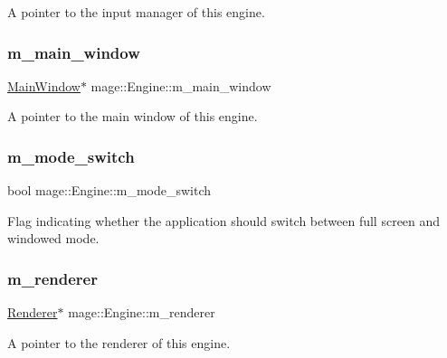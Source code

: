 A pointer to the input manager of this engine. \hypertarget{classmage_1_1_engine_abe33f2ef533f142a0e9ba8d3a2a51d6b}{}\label{classmage_1_1_engine_abe33f2ef533f142a0e9ba8d3a2a51d6b} 
\subsubsection{\texorpdfstring{m\+\_\+main\+\_\+window}{m\_main\_window}}
{\footnotesize\ttfamily \hyperlink{classmage_1_1_main_window}{Main\+Window}$\ast$ mage\+::\+Engine\+::m\+\_\+main\+\_\+window\hspace{0.3cm}{\ttfamily [private]}}

A pointer to the main window of this engine. \hypertarget{classmage_1_1_engine_aa5cb2e0b7bb2c4a9020e79ab832ee221}{}\label{classmage_1_1_engine_aa5cb2e0b7bb2c4a9020e79ab832ee221} 
\subsubsection{\texorpdfstring{m\+\_\+mode\+\_\+switch}{m\_mode\_switch}}
{\footnotesize\ttfamily bool mage\+::\+Engine\+::m\+\_\+mode\+\_\+switch\hspace{0.3cm}{\ttfamily [private]}}

Flag indicating whether the application should switch between full screen and windowed mode. \hypertarget{classmage_1_1_engine_ad2107f910b4471ee3d3934588c6d36c3}{}\label{classmage_1_1_engine_ad2107f910b4471ee3d3934588c6d36c3} 
\subsubsection{\texorpdfstring{m\+\_\+renderer}{m\_renderer}}
{\footnotesize\ttfamily \hyperlink{classmage_1_1_renderer}{Renderer}$\ast$ mage\+::\+Engine\+::m\+\_\+renderer\hspace{0.3cm}{\ttfamily [private]}}

A pointer to the renderer of this engine. \hypertarget{classmage_1_1_engine_a4faf1b8f94a84be27dd63054bf6fe36d}{}\label{classmage_1_1_engine_a4faf1b8f94a84be27dd63054bf6fe36d} 
